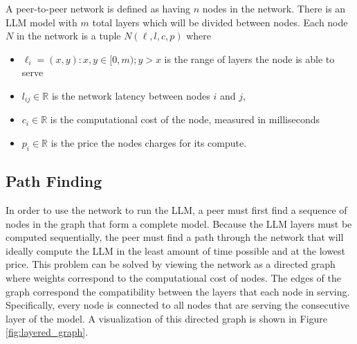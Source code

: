 \documentclass[preprint,twoside,11pt]{article}
\begin{document}
A peer-to-peer network is defined as having $n$ nodes in the network. There is an LLM model with $m$ total layers which will be divided between nodes.
Each node $N$ in the network is a tuple $N(\ell, l, c, p)$ where
\begin{itemize}
	\item $\ell _i = (x,y) : x,y \in [0,m); y > x$ is the range of layers the node is able to serve
	\item $l_{ij} \in \mathbb{R}$ is the network latency between nodes $i$ and $j$,
	\item $c_i \in \mathbb{R}$ is the computational cost of the node, measured in milliseconds
	\item $p_i \in \mathbb{R}$ is the price the nodes charges for its compute.
\end{itemize}

\subsection{Path Finding}

In order to use the network to run the LLM, a peer must first find a sequence of nodes in the graph that form a complete model.
Because the LLM layers must be computed sequentially, the peer must find a path through the network that will ideally compute
the LLM in the least amount of time possible and at the lowest price. This problem can be solved by viewing the network as a directed graph where weights correspond
to the computational cost of nodes. The edges of the graph correspond the compatibility between the layers that each node in serving.
Specifically, every node is connected to all nodes that are serving the consecutive layer of the model. A visualization of this directed graph is shown in Figure \ref{fig:layered_graph}.
\end{document}

